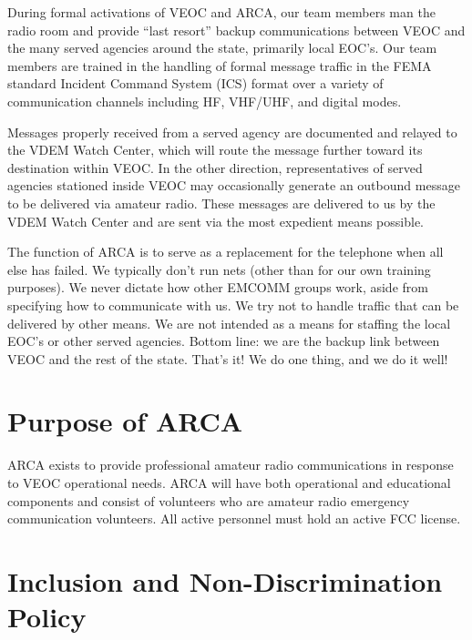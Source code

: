 \documentclass[pdflatex,letterpaper,twoside,12pt]{book}
\begin{document}
During formal activations of VEOC and ARCA, our team members man the radio room and provide ``last resort'' backup communications between VEOC and the many served agencies around the state, primarily local EOC's.  Our team members are trained in the handling of formal message traffic in the FEMA standard Incident Command System (ICS) format over a variety of communication channels including HF, VHF/UHF, and digital modes.

Messages properly received from a served agency are documented and relayed to the VDEM Watch Center, which will route the message further toward its destination within VEOC.  In the other direction, representatives of served agencies stationed inside VEOC may occasionally generate an outbound message to be delivered via amateur radio.  These messages are delivered to us by the VDEM Watch Center and are sent via the most expedient means possible.

The function of ARCA is to serve as a replacement for the telephone when all else has failed.  We typically don't run nets (other than for our own training purposes).  We never dictate how other EMCOMM groups work, aside from specifying how to communicate with us.  We try not to handle traffic that can be delivered by other means.  We are not intended as a means for staffing the local EOC's or other served agencies.  Bottom line:  we are the backup link between VEOC and the rest of the state.  That's it!  We do one thing, and we do it well!


\section{Purpose of ARCA}

ARCA exists to provide professional amateur radio communications in response to VEOC operational needs.  ARCA will have both operational and educational components and consist of volunteers who are amateur radio emergency communication volunteers.  All active personnel must hold an active FCC license.


\section{Inclusion and Non-Discrimination Policy}
\end{document}
